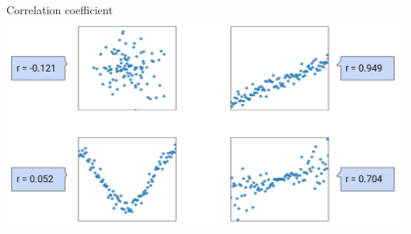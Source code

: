 \documentclass[aspectratio=169]{../latex_main/tntbeamer}  %
\begin{document}
	
	
	\begin{frame}{Correlation coefficient}
	    \includegraphics[scale=.4]{Bild2}
	\end{frame}
\end{document}
